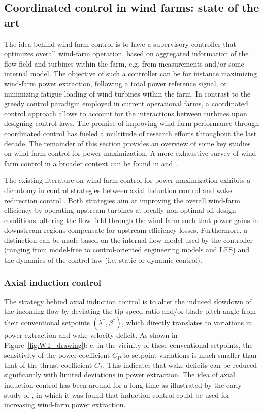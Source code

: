 \subsection{Coordinated control in wind farms: state of the art}
The idea behind wind-farm control is to have a supervisory controller that optimizes overall wind-farm operation, based on aggregated information of the flow field and turbines within the farm, e.g. from measurements and/or some internal model. The objective of such a controller can be for instance maximizing wind-farm power extraction, following a total power reference signal, or minimizing fatigue loading of wind turbines within the farm. In contrast to the greedy control paradigm employed in current operational farms, a coordinated control approach allows to account for the interactions between turbines upon designing control laws. The promise of improving wind-farm performance through coordinated control has fueled a multitude of research efforts throughout the last decade. The remainder of this section provides an overview of some key studies on wind-farm control for power maximization. A more exhaustive survey of wind-farm control in a broader context can be found in \cite{knudsen2015survey} and \cite{boersma2017tutorial}.

The existing literature on wind-farm control for power maximization exhibits a dichotomy in control strategies between axial induction control and wake redirection control \citep{boersma2017tutorial}. Both strategies aim at improving the overall wind-farm efficiency by operating upstream turbines at locally non-optimal off-design conditions, altering the flow field through the wind farm such that power gains in downstream regions compensate for upstream efficiency losses. Furthermore, a distinction can be made based on the internal flow model used by the controller (ranging from model-free to control-oriented engineering models and LES) and the dynamics of the control law (i.e. static or dynamic control).

\subsubsection{Axial induction control}
The strategy behind axial induction control is to alter the induced slowdown of the incoming flow by deviating the tip speed ratio and/or blade pitch angle from their conventional setpoints $(\lambda^*, \beta^*)$, which directly translates to variations in power extraction and wake velocity deficit. As shown in Figure~\ref{fig:WT_drawing}b-c, in the vicinity of these conventional setpoints, the sensitivity of the power coefficient $C_P$ to setpoint variations is much smaller than that of the thrust coefficient $C_T$. This indicates that wake deficits can be reduced significantly with limited deviations in power extraction. The idea of axial induction control has been around for a long time as illustrated by the early study of \cite{steinbuch}, in which it was found that induction control could be used for increasing wind-farm power extraction. 

